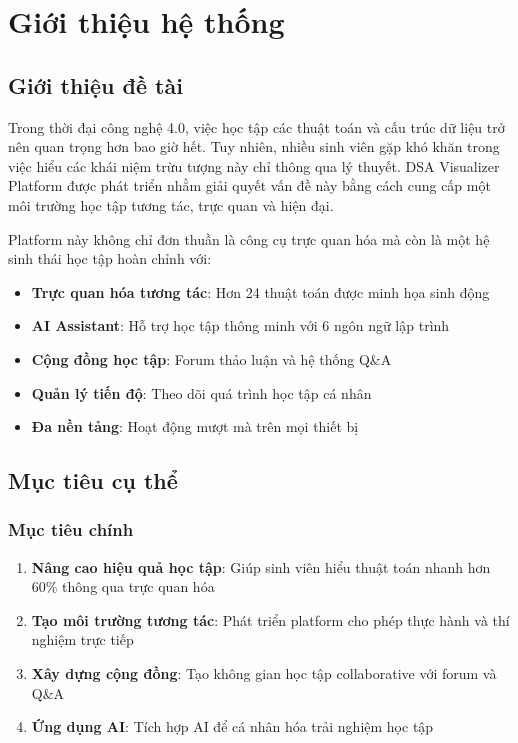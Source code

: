 \documentclass[12pt,a4paper]{article}
\begin{document}
\section{Giới thiệu hệ thống}

\subsection{Giới thiệu đề tài}

Trong thời đại công nghệ 4.0, việc học tập các thuật toán và cấu trúc dữ liệu trở nên quan trọng hơn bao giờ hết. Tuy nhiên, nhiều sinh viên gặp khó khăn trong việc hiểu các khái niệm trừu tượng này chỉ thông qua lý thuyết. DSA Visualizer Platform được phát triển nhằm giải quyết vấn đề này bằng cách cung cấp một môi trường học tập tương tác, trực quan và hiện đại.

Platform này không chỉ đơn thuần là công cụ trực quan hóa mà còn là một hệ sinh thái học tập hoàn chỉnh với:
\begin{itemize}
    \item \textbf{Trực quan hóa tương tác}: Hơn 24 thuật toán được minh họa sinh động
    \item \textbf{AI Assistant}: Hỗ trợ học tập thông minh với 6 ngôn ngữ lập trình
    \item \textbf{Cộng đồng học tập}: Forum thảo luận và hệ thống Q\&A
    \item \textbf{Quản lý tiến độ}: Theo dõi quá trình học tập cá nhân
    \item \textbf{Đa nền tảng}: Hoạt động mượt mà trên mọi thiết bị
\end{itemize}

\subsection{Mục tiêu cụ thể}

\subsubsection{Mục tiêu chính}
\begin{enumerate}
    \item \textbf{Nâng cao hiệu quả học tập}: Giúp sinh viên hiểu thuật toán nhanh hơn 60\% thông qua trực quan hóa
    \item \textbf{Tạo môi trường tương tác}: Phát triển platform cho phép thực hành và thí nghiệm trực tiếp
    \item \textbf{Xây dựng cộng đồng}: Tạo không gian học tập collaborative với forum và Q\&A
    \item \textbf{Ứng dụng AI}: Tích hợp AI để cá nhân hóa trải nghiệm học tập
\end{enumerate}
\end{document}
